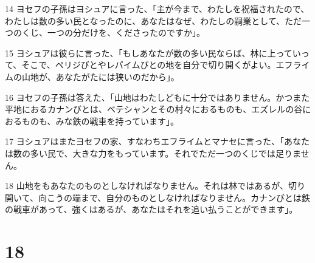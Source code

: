 \par 14 ヨセフの子孫はヨシュアに言った、「主が今まで、わたしを祝福されたので、わたしは数の多い民となったのに、あなたはなぜ、わたしの嗣業として、ただ一つのくじ、一つの分だけを、くださったのですか」。
\par 15 ヨシュアは彼らに言った、「もしあなたが数の多い民ならば、林に上っていって、そこで、ペリジびとやレパイムびとの地を自分で切り開くがよい。エフライムの山地が、あなたがたには狭いのだから」。
\par 16 ヨセフの子孫は答えた、「山地はわたしどもに十分ではありません。かつまた平地におるカナンびとは、ベテシャンとその村々におるものも、エズレルの谷におるものも、みな鉄の戦車を持っています」。
\par 17 ヨシュアはまたヨセフの家、すなわちエフライムとマナセに言った、「あなたは数の多い民で、大きな力をもっています。それでただ一つのくじでは足りません。
\par 18 山地をもあなたのものとしなければなりません。それは林ではあるが、切り開いて、向こうの端まで、自分のものとしなければなりません。カナンびとは鉄の戦車があって、強くはあるが、あなたはそれを追い払うことができます」。

\chapter{18}

